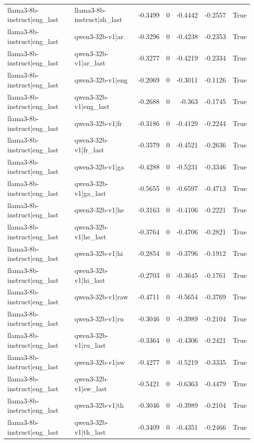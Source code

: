 \begin{table}
\begin{tabular}{l l r r r r l}
llama3-8b-instruct|eng_last & llama3-8b-instruct|zh_last & -0.3499 & 0 & -0.4442 & -0.2557 & True \\
llama3-8b-instruct|eng_last & qwen3-32b-v1|ar & -0.3296 & 0 & -0.4238 & -0.2353 & True \\
llama3-8b-instruct|eng_last & qwen3-32b-v1|ar_last & -0.3277 & 0 & -0.4219 & -0.2334 & True \\
llama3-8b-instruct|eng_last & qwen3-32b-v1|eng & -0.2069 & 0 & -0.3011 & -0.1126 & True \\
llama3-8b-instruct|eng_last & qwen3-32b-v1|eng_last & -0.2688 & 0 & -0.363 & -0.1745 & True \\
llama3-8b-instruct|eng_last & qwen3-32b-v1|fr & -0.3186 & 0 & -0.4129 & -0.2244 & True \\
llama3-8b-instruct|eng_last & qwen3-32b-v1|fr_last & -0.3579 & 0 & -0.4521 & -0.2636 & True \\
llama3-8b-instruct|eng_last & qwen3-32b-v1|ga & -0.4288 & 0 & -0.5231 & -0.3346 & True \\
llama3-8b-instruct|eng_last & qwen3-32b-v1|ga_last & -0.5655 & 0 & -0.6597 & -0.4713 & True \\
llama3-8b-instruct|eng_last & qwen3-32b-v1|he & -0.3163 & 0 & -0.4106 & -0.2221 & True \\
llama3-8b-instruct|eng_last & qwen3-32b-v1|he_last & -0.3764 & 0 & -0.4706 & -0.2821 & True \\
llama3-8b-instruct|eng_last & qwen3-32b-v1|hi & -0.2854 & 0 & -0.3796 & -0.1912 & True \\
llama3-8b-instruct|eng_last & qwen3-32b-v1|hi_last & -0.2703 & 0 & -0.3645 & -0.1761 & True \\
llama3-8b-instruct|eng_last & qwen3-32b-v1|raw & -0.4711 & 0 & -0.5654 & -0.3769 & True \\
llama3-8b-instruct|eng_last & qwen3-32b-v1|ru & -0.3046 & 0 & -0.3989 & -0.2104 & True \\
llama3-8b-instruct|eng_last & qwen3-32b-v1|ru_last & -0.3364 & 0 & -0.4306 & -0.2421 & True \\
llama3-8b-instruct|eng_last & qwen3-32b-v1|sw & -0.4277 & 0 & -0.5219 & -0.3335 & True \\
llama3-8b-instruct|eng_last & qwen3-32b-v1|sw_last & -0.5421 & 0 & -0.6363 & -0.4479 & True \\
llama3-8b-instruct|eng_last & qwen3-32b-v1|th & -0.3046 & 0 & -0.3989 & -0.2104 & True \\
llama3-8b-instruct|eng_last & qwen3-32b-v1|th_last & -0.3409 & 0 & -0.4351 & -0.2466 & True \\

\end{tabular}
\end{table}

